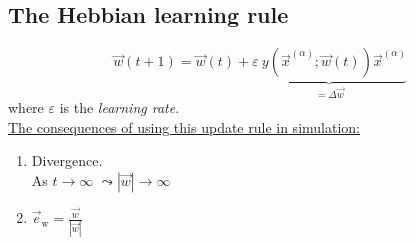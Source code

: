 \subsection{The Hebbian learning rule}

\begin{frame}{\subsecname}
\begin{equation}
\vec w(t+1) = \vec w(t) + \underbrace{\varepsilon~y(\vec x^ {(\alpha)}; \vec w(t)) \vec x^{(\alpha)}}_{= \Delta \vec w}
\end{equation}
where $\varepsilon$ is the \emph{learning rate}.\\

\underline{The consequences of using this update rule in simulation:}\\

\begin{enumerate}
\item Divergence.\\
As $t \rightarrow \infty$ \qquad $\leadsto |\vec{w}| \rightarrow \infty$\\

\pause 


\pause

\item $\vec{e}_{\mathrm{w}} = \frac{\vec{w}}{|\vec{w}|}$ 
\end{enumerate}

\end{frame}

